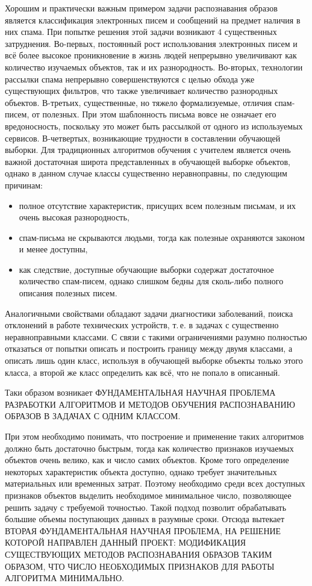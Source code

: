 \documentclass[12pt,a4paper]{article}
\begin{document}
	Хорошим и практически важным примером задачи распознавания образов является классификация электронных писем и сообщений на предмет наличия в них спама. 
	При попытке решения этой задачи возникают 4 существенных затруднения. 
	Во-первых, постоянный рост использования электронных писем и всё более высокое проникновение в жизнь людей непрерывно увеличивают как количество изучаемых объектов, так и их разнородность.
	Во-вторых, технологии рассылки спама непрерывно совершенствуются с целью обхода уже существующих фильтров, что также увеличивает количество разнородных объектов.
	В-третьих, существенные, но тяжело формализуемые, отличия спам-писем, от полезных. 
	При этом шаблонность письма вовсе не означает его вредоносность, поскольку это может быть рассылкой от одного из используемых сервисов.
	В-четвертых, возникающие трудности в составлении обучающей выборки. Для традиционных алгоритмов обучения с учителем является очень важной достаточная широта представленных в обучающей выборке объектов, однако в данном случае классы существенно неравноправны, по следующим причинам:
	\begin{itemize}
	 	\item полное отсутствие характеристик, присущих всем полезным письмам, и их очень высокая разнородность,
	 	\item спам-письма не скрываются людьми, тогда как полезные охраняются законом и менее доступны,
	 	\item как следствие, доступные обучающие выборки содержат достаточное количество спам-писем, однако слишком бедны для сколь-либо полного описания полезных писем.
	\end{itemize}

	Аналогичными свойствами обладают задачи диагностики заболеваний, поиска отклонений в работе технических устройств, т.\,е. в задачах с существенно неравноправными классами.
	С связи с такими ограничениями разумно полностью отказаться от попытки описать и построить границу между двумя классами, а описать лишь один класс, используя в обучающей выборке объекты только этого класса, а второй же класс определить как всё, что не попало в описанный.

	Таки образом возникает \MakeTextUppercase{фундаментальная научная проблема разработки алгоритмов и методов обучения распознаванию образов в задачах с одним классом.}

	При этом необходимо понимать, что построение и применение таких алгоритмов должно быть достаточно быстрым, тогда как количество признаков изучаемых объектов очень велико, как и число самих объектов. 
	Кроме того определение некоторых характеристик объекта доступно, однако требует значительных материальных или временных затрат. 
	Поэтому необходимо среди всех доступных признаков объектов выделить необходимое минимальное число, позволяющее решить задачу с требуемой точностью. Такой подход позволит обрабатывать большие объемы поступающих данных в разумные сроки.
	Отсюда вытекает \MakeTextUppercase{вторая фундаментальная научная проблема, на решение которой направлен данный проект: модификация существующих методов распознавания образов таким образом, что число необходимых признаков для работы алгоритма минимально.}
\end{document}
